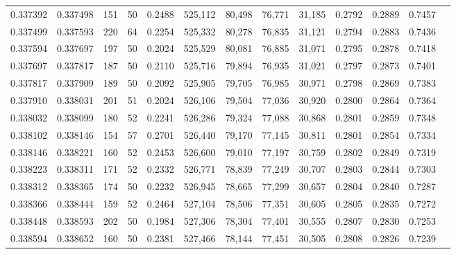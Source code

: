 \begin{tabular}{rrrrrrrrrrrrr}
0.337392 & 0.337498 &   151 &  50 &                                     0.2488 & 525,112 &  80,498 &  76,771 &  31,185 & 0.2792 & 0.2889 & 0.7457 \\
0.337499 & 0.337593 &   220 &  64 &                                     0.2254 & 525,332 &  80,278 &  76,835 &  31,121 & 0.2794 & 0.2883 & 0.7436 \\
0.337594 & 0.337697 &   197 &  50 &                                     0.2024 & 525,529 &  80,081 &  76,885 &  31,071 & 0.2795 & 0.2878 & 0.7418 \\
0.337697 & 0.337817 &   187 &  50 &                                     0.2110 & 525,716 &  79,894 &  76,935 &  31,021 & 0.2797 & 0.2873 & 0.7401 \\
0.337817 & 0.337909 &   189 &  50 &                                     0.2092 & 525,905 &  79,705 &  76,985 &  30,971 & 0.2798 & 0.2869 & 0.7383 \\
0.337910 & 0.338031 &   201 &  51 &                                     0.2024 & 526,106 &  79,504 &  77,036 &  30,920 & 0.2800 & 0.2864 & 0.7364 \\
0.338032 & 0.338099 &   180 &  52 &                                     0.2241 & 526,286 &  79,324 &  77,088 &  30,868 & 0.2801 & 0.2859 & 0.7348 \\
0.338102 & 0.338146 &   154 &  57 &                                     0.2701 & 526,440 &  79,170 &  77,145 &  30,811 & 0.2801 & 0.2854 & 0.7334 \\
0.338146 & 0.338221 &   160 &  52 &                                     0.2453 & 526,600 &  79,010 &  77,197 &  30,759 & 0.2802 & 0.2849 & 0.7319 \\
0.338223 & 0.338311 &   171 &  52 &                                     0.2332 & 526,771 &  78,839 &  77,249 &  30,707 & 0.2803 & 0.2844 & 0.7303 \\
0.338312 & 0.338365 &   174 &  50 &                                     0.2232 & 526,945 &  78,665 &  77,299 &  30,657 & 0.2804 & 0.2840 & 0.7287 \\
0.338366 & 0.338444 &   159 &  52 &                                     0.2464 & 527,104 &  78,506 &  77,351 &  30,605 & 0.2805 & 0.2835 & 0.7272 \\
0.338448 & 0.338593 &   202 &  50 &                                     0.1984 & 527,306 &  78,304 &  77,401 &  30,555 & 0.2807 & 0.2830 & 0.7253 \\
0.338594 & 0.338652 &   160 &  50 &                                     0.2381 & 527,466 &  78,144 &  77,451 &  30,505 & 0.2808 & 0.2826 & 0.7239 \\

\end{tabular}
